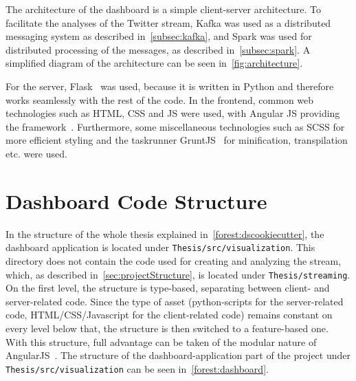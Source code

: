 The architecture of the dashboard is a simple client-server architecture.
To facilitate the analyses of the Twitter stream,
Kafka was used as a distributed messaging system as described in~\cref{subsec:kafka},
and Spark was used for distributed processing of the messages, as described in~\cref{subsec:spark}.
A simplified diagram of the architecture can be seen in~\cref{fig:architecture}.

For the server, Flask~\cite{flaskDocs} was used, because it is written in Python and therefore works seamlessly with the rest of the code.
In the frontend, common web technologies such as HTML, CSS and JS were used, with Angular JS providing the framework~\cite{angularDocs}.
Furthermore, some miscellaneous technologies such as SCSS\cite{scssDocs} for more efficient styling and the taskrunner GruntJS~\cite{gruntDocs} for
minification, transpilation etc. were used.

\section{Dashboard Code Structure}
\label{sec:dashboardCodeStructure}

In the structure of the whole thesis explained
in~\cref{forest:dscookiecutter}, the dashboard application is located under \texttt{Thesis/src/visualization}.
This directory does not contain the code used for creating and analyzing the stream,
which, as described in~\cref{sec:projectStructure}, is located under \texttt{Thesis/streaming}.
On the first level, the structure is type-based, separating between client- and server-related code.
Since the type of asset (python-scripts for the server-related code, HTML/CSS/Javascript for the client-related code)
remains constant on every level below that, the structure is then switched to a feature-based one.
With this structure, full advantage can be taken of the modular nature of AngularJS~\cite{angularDocs}.
The structure of the dashboard-application part of the project under \texttt{Thesis/src/visualization} can be seen in~\cref{forest:dashboard}.


